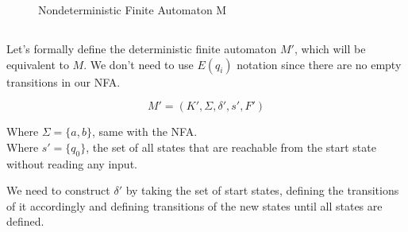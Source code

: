 \documentclass[12pt]{article}
\begin{document}
\begin{figure}[ht]
    \centering
    \caption{Nondeterministic Finite Automaton M}
    \label{fig:nfa}
\end{figure}

\subsection{}

\begin{center}
Let's formally define the deterministic finite automaton $M'$, which will be equivalent to $M$. We don't need to use $E(q_i)$ notation since there are no empty transitions in our NFA.
\end{center}
\begin{equation*}
M' = (K', \Sigma, \delta', s', F')
\end{equation*}
\begin{center}
Where $\Sigma = \{a, b\}$, same with the NFA. \\
Where $s' = \{q_0\}$, the set of all states that are reachable from the start state without reading any input. \\
\end{center}

\newpage

\begin{center}
We need to construct $\delta'$ by taking the set of start states, defining the transitions of it accordingly and defining transitions of the new states until all states are defined.
\end{center}
\end{document}
